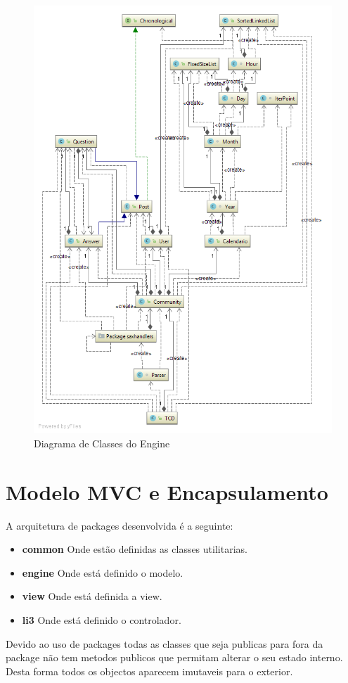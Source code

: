 \documentclass[10pt,a4paper]{report}
\begin{document}
    \begin{figure}[h]
        \centering
        \includegraphics[width=\textwidth]{./images/FullDiagram.png}
        \caption{Diagrama de Classes do Engine}
        \label{fig:fulldiagram}
    \end{figure}


\chapter{Modelo MVC e Encapsulamento}
    A arquitetura de packages desenvolvida é a seguinte:
    \begin{itemize}
        \item \textbf{common} Onde estão definidas as classes utilitarias.
        \item \textbf{engine} Onde está definido o modelo.
        \item \textbf{view} Onde está definida a view.
        \item \textbf{li3} Onde está definido o controlador.
    \end{itemize}
    Devido ao uso de packages todas as classes que seja publicas para fora da
    package não tem metodos publicos que permitam alterar o seu estado interno.
    Desta forma todos os objectos aparecem imutaveis para o exterior.
\end{document}
